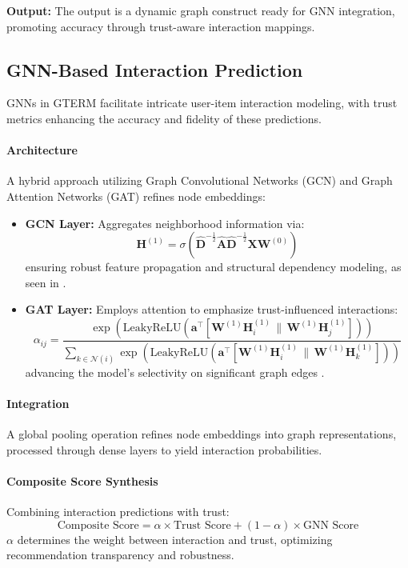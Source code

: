 \documentclass{article} %
\begin{document}
\textbf{Output:} The output is a dynamic graph construct ready for GNN integration, promoting accuracy through trust-aware interaction mappings.

\subsection{GNN-Based Interaction Prediction}

GNNs in GTERM facilitate intricate user-item interaction modeling, with trust metrics enhancing the accuracy and fidelity of these predictions.

\paragraph{Architecture} A hybrid approach utilizing Graph Convolutional Networks (GCN) and Graph Attention Networks (GAT) refines node embeddings:

\begin{itemize}
    \item \textbf{GCN Layer:} Aggregates neighborhood information via:
    \[
    \mathbf{H}^{(1)} = \sigma(\widehat{\mathbf{D}}^{-\frac{1}{2}} \widehat{\mathbf{A}} \widehat{\mathbf{D}}^{-\frac{1}{2}} \mathbf{X} \mathbf{W}^{(0)})
    \]
    ensuring robust feature propagation and structural dependency modeling, as seen in \citep{kipf2017semisupervised}.

    \item \textbf{GAT Layer:} Employs attention to emphasize trust-influenced interactions:
    \[
    \alpha_{ij} = \frac{\exp(\text{LeakyReLU}(\mathbf{a}^\top[\mathbf{W}^{(1)} \mathbf{H}^{(1)}_i \, \| \, \mathbf{W}^{(1)} \mathbf{H}^{(1)}_j]))}{\sum_{k \in \mathcal{N}(i)} \exp(\text{LeakyReLU}(\mathbf{a}^\top[\mathbf{W}^{(1)} \mathbf{H}^{(1)}_i \, \| \, \mathbf{W}^{(1)} \mathbf{H}^{(1)}_k]))}
    \]
    advancing the model's selectivity on significant graph edges \citep{velivckovic2018graph}.
\end{itemize}

\paragraph{Integration} A global pooling operation refines node embeddings into graph representations, processed through dense layers to yield interaction probabilities.

\paragraph{Composite Score Synthesis} Combining interaction predictions with trust:
\[
\text{Composite Score} = \alpha \times \text{Trust Score} + (1 - \alpha) \times \text{GNN Score}
\]
\(\alpha\) determines the weight between interaction and trust, optimizing recommendation transparency and robustness.
\end{document}
